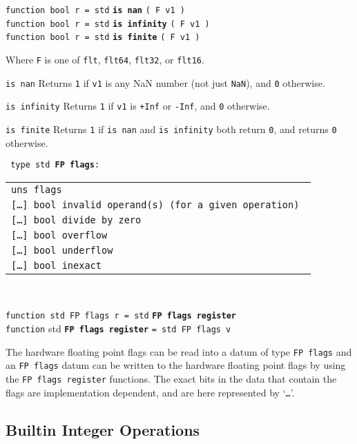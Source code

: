 \documentclass[12pt]{article}
\newcommand{\ttkey}[1]{{\tt \bfseries #1}}
\newenvironment{indpar}[1][0.3in]%
	{\begin{list}{}%
		     {\setlength{\itemsep}{0in}%
		      \setlength{\topsep}{0in}%
		      \setlength{\parsep}{1ex}%
		      \setlength{\labelwidth}{#1}%
		      \setlength{\leftmargin}{#1}%
		      \addtolength{\leftmargin}{\labelsep}}%
	 \item}%
	{\end{list}}
\newenvironment{itemlist}[1][1.2in]%
	{\begin{list}{}{\setlength{\labelwidth}{#1}%
		        \setlength{\leftmargin}{\labelwidth}%
		        \addtolength{\leftmargin}{+0.2in}%
		        \renewcommand{\makelabel}[1]{##1\hfill}}}%
	{\end{list}}
\begin{document}
{\tt function bool r = std} \ttkey{is nan} {\tt ( F v1 )} \\
{\tt function bool r = std} \ttkey{is infinity} {\tt ( F v1 )} \\
{\tt function bool r = std} \ttkey{is finite} {\tt ( F v1 )}
\begin{indpar}
Where {\tt F} is one of {\tt flt}, {\tt flt64}, {\tt flt32}, or {\tt flt16}.
\begin{itemlist}
\item[\tt is nan]
Returns {\tt 1} if {\tt v1} is any NaN number (not just {\tt NaN}), and {\tt 0}
otherwise.
\item[\tt is infinity]
Returns {\tt 1} if {\tt v1} is {\tt +Inf} or {\tt -Inf}, and {\tt 0}
otherwise.
\item[\tt is finite]
Returns {\tt 1} if {\tt is nan} and {\tt is infinity} both return {\tt 0},
and returns {\tt 0} otherwise.
\end{itemlist}
\end{indpar}

{\tt
type~std~\ttkey{FP flags}: \\
\begin{tabular}[t]{@{~~~~~}l}
\tt uns flags \\
\tt [\ldots] bool invalid operand(s) (for a given operation) \\
\tt [\ldots] bool divide by zero \\
\tt [\ldots] bool overflow \\
\tt [\ldots] bool underflow \\
\tt [\ldots] bool inexact \\
\end{tabular} \\
}
{\tt function std FP flags r = std} \ttkey{FP flags register} \\
{\tt function} std \ttkey{FP flags register} {\tt = std FP flags v}
\begin{indpar}
The hardware floating point flags can be read into a datum of type
{\tt FP flags} and an {\tt FP flags} datum can be written
to the hardware floating point flags by using the {\tt FP flags register}
functions.  The exact bits in the data that contain the flags
are implementation dependent, and are here represented by `{\tt \ldots{}}'.
\end{indpar}

\subsection{Builtin Integer Operations}
\label{BUILTIN-INTEGER-OPERATIONS}
\end{document}
